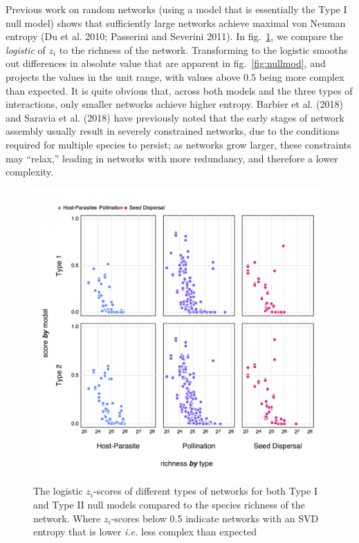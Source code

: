 \documentclass[11pt]{article}
\makeatletter
\def\maxwidth{\ifdim\Gin@nat@width>\linewidth\linewidth
\else\Gin@nat@width\fi}
\let\Oldincludegraphics\includegraphics
\renewcommand{\includegraphics}[1]{\Oldincludegraphics[width=\maxwidth]{#1}}
\makeatother
\begin{document}
Previous work on random networks (using a model that is essentially the
Type I null model) shows that sufficiently large networks achieve
maximal von Neuman entropy (Du et al. 2010; Passerini and Severini
2011). In fig.~\ref{fig:larger}, we compare the \emph{logistic} of
\(z_i\) to the richness of the network. Transforming to the logistic
smooths out differences in absolute value that are apparent in
fig.~\ref{fig:nullmod}, and projects the values in the unit range, with
values above \(0.5\) being more complex than expected. It is quite
obvious that, across both models and the three types of interactions,
only smaller networks achieve higher entropy. Barbier et al. (2018) and
Saravia et al. (2018) have previously noted that the early stages of
network assembly usually result in severely constrained networks, due to
the conditions required for multiple species to persist; as networks
grow larger, these constraints may ``relax,'' leading in networks with
more redundancy, and therefore a lower complexity.

\begin{figure}
\hypertarget{fig:larger}{%
\centering
\includegraphics{figures/nullmodel_richness.png}
\caption{The logistic \(z_i\)-scores of different types of networks for
both Type I and Type II null models compared to the species richness of
the network. Where \(z_i\)-scores below 0.5 indicate networks with an
SVD entropy that is lower \emph{i.e.} less complex than
expected}\label{fig:larger}
}
\end{figure}
\end{document}
